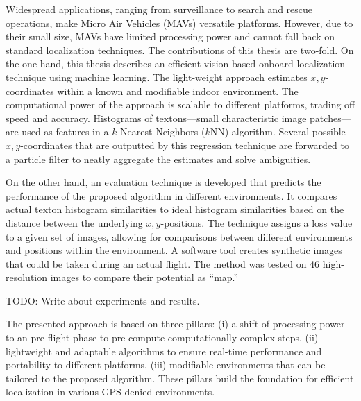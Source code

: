Widespread applications, ranging from surveillance to search and rescue operations, make Micro Air Vehicles (MAVs) versatile platforms.
However, due to their small size, MAVs have limited processing power and cannot
fall back on standard localization techniques. %
The contributions of this thesis are two-fold. On the one hand, this thesis describes an efficient vision-based onboard localization
technique using machine learning. The light-weight approach estimates $x,y$-coordinates within a known and modifiable indoor environment. The computational power of the approach is scalable to different platforms, trading off speed and accuracy.
Histograms of textons---small characteristic image patches---are used as features in a $k$-Nearest Neighbors ($k$NN) algorithm. Several possible $x,y$-coordinates that are outputted by this regression technique are forwarded to a particle filter to neatly aggregate the estimates and solve ambiguities.

On the other hand, an evaluation technique is developed that predicts the performance of the proposed algorithm in different environments. It compares actual texton histogram similarities to
ideal histogram similarities based on the distance between the underlying
$x,y$-positions. The technique assigns a loss value to a given set of
images, allowing for comparisons between different environments and positions within the environment. A software tool creates synthetic images
that could be taken during an actual flight. The method was tested on 46 high-resolution images to compare their potential as ``map.''


TODO: Write about experiments and results. 

The presented approach is based on three pillars: (i) a shift of processing power to an pre-flight phase to pre-compute
computationally complex steps, (ii) lightweight and adaptable algorithms to ensure real-time performance and portability to different platforms, (iii) modifiable environments that can be tailored to the proposed algorithm. These pillars build the foundation for efficient localization in various GPS-denied environments.